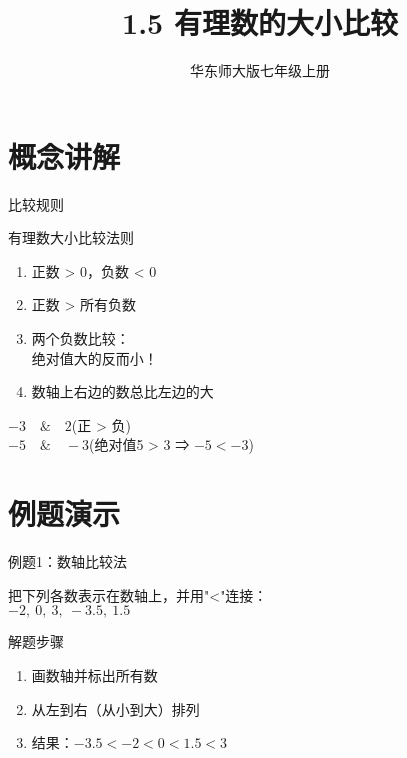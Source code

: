 \documentclass[aspectratio=169]{ctexbeamer}
\title{1.5 有理数的大小比较}
\author{华东师大版七年级上册}
\date{}
\begin{document}
\begin{frame}
    \titlepage
\end{frame}

\section{概念讲解}
\begin{frame}{比较规则}
    \begin{block}{有理数大小比较法则}
        \begin{enumerate}
            \item 正数 \alert{>} 0，负数 \alert{<} 0
            \item 正数 \alert{>} 所有负数
            \item 两个负数比较：\\绝对值大的反而\alert{小}！
            \item 数轴上右边的数总比左边的\alert{大}
        \end{enumerate}
    \end{block}
    
    \begin{example}
        $-3 \quad \& \quad 2$\quad (正 > 负)\\
        $-5 \quad \& \quad -3$\quad (绝对值5 > 3 ⇒ $-5 < -3$)
    \end{example}
\end{frame}

\section{例题演示}
\begin{frame}{例题1：数轴比较法}
    \begin{example}
        把下列各数表示在数轴上，并用"<"连接：\\
        $-2,\ 0,\ 3,\ -3.5,\ 1.5$
    \end{example}
    
    \pause
    \begin{block}{解题步骤}
        \begin{enumerate}
            \item 画数轴并标出所有数
            \item 从左到右（从小到大）排列
            \item 结果：$-3.5 < -2 < 0 < 1.5 < 3$
        \end{enumerate}
    \end{block}
\end{frame}
\end{document}

